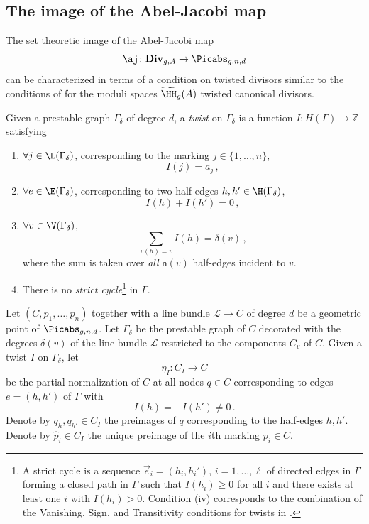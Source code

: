 \subsection{The image of the Abel-Jacobi map}\label{sec:image_of_aj}
The set theoretic image of the Abel-Jacobi map
$$\aj\colon \cat{Div}_{g, A} \to \Picabs_{g,n,d}$$
can be characterized
in terms of a condition on twisted divisors similar to the
conditions of \cite{Farkas2016The-moduli-spac} for the moduli spaces $\widetilde{\HH}_g(A)$
twisted
canonical divisors.

Given a prestable graph $\Gamma_{\delta}$ of degree $d$, a \emph{twist} on $\Gamma_\delta$ is a function $I: H(\Gamma) \to \mathbb{Z}$ satisfying
\begin{enumerate}
\item[(i)] $\forall j\in \L(\Gamma_\delta)$, corresponding to
 the marking $j\in \{1,\ldots, n\}$,
$$I(j)=a_j\, ,$$
\item[(ii)] $\forall e \in \E(\Gamma_\delta)$, corresponding to two half-edges
$h,h' \in \H(\Gamma_\delta)$,
$$I(h)+I(h')=0 \, ,$$
\item[(iii)] $\forall v\in \V(\Gamma_\delta)$,
$$\sum_{v(h)= v} I(h)= \delta(v) \, ,$$
where the sum is taken over {\em all} $\mathsf{n}(v)$ half-edges incident
to $v$.%
\item[(iv)] There is no \emph{strict cycle}\footnote{A strict cycle
 is a sequence $\vec e_i = (h_i, h_i')$, $i=1, \ldots, \ell$ of directed edges in $\Gamma$ forming a closed path in $\Gamma$ such that $I(h_i) \geq 0$ for all $i$ and there exists at least one $i$ with $I(h_i)>0$. Condition (iv)
corresponds to the combination of the Vanishing, Sign, and Transitivity conditions for twists in \cite[Section 0.3]{Farkas2016The-moduli-spac}.} in $\Gamma$.
\end{enumerate}


Let $(C,p_1, \ldots, p_n)$ together with a line bundle $\mathcal{L} \to C$ of degree $d$ be a geometric point of $\Picabs_{g,n,d}$. Let $\Gamma_\delta$ be the prestable graph of $C$ decorated with the degrees $\delta(v)$ of the line bundle $\mathcal{L}$ restricted to the components $C_v$ of $C$. Given a twist $I$ on $\Gamma_\delta$, let
\[\eta_I : C_I \to C\]
be the partial normalization of $C$ at all nodes $q \in C$ corresponding to edges $e=(h,h')$ of $\Gamma$ with $$I(h) = -I(h') \neq 0\, .$$
Denote by $q_h, q_{h'} \in C_I$ the preimages of $q$ corresponding to the half-edges $h,h'$. Denote by $\widehat{p}_i \in C_I$ the unique preimage of the $i$th marking $p_i \in C$.

